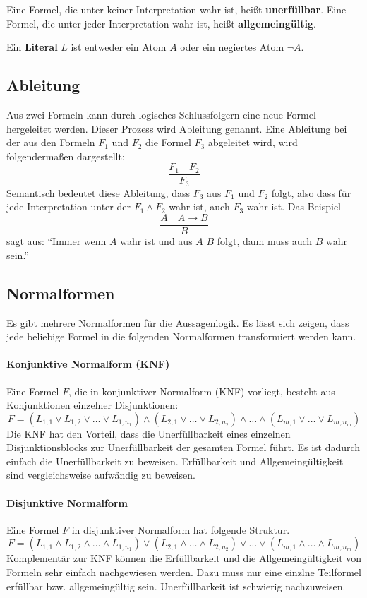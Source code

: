 Eine Formel, die unter keiner Interpretation wahr ist, heißt \textbf{unerfüllbar}. Eine Formel, die unter jeder Interpretation wahr ist, heißt \textbf{allgemeingültig}.

Ein \textbf{Literal} $L$ ist entweder ein Atom $A$ oder ein negiertes Atom $\neg A$. 
		\subsection{Ableitung}
Aus zwei Formeln kann durch logisches Schlussfolgern eine neue Formel hergeleitet werden. Dieser Prozess wird Ableitung genannt. Eine Ableitung bei der aus den Formeln $F_1$ und $F_2$ die Formel $F_3$ abgeleitet wird, wird folgendermaßen dargestellt:
$$\frac{F_1 \quad F_2}{F_3}$$
Semantisch bedeutet diese Ableitung, dass $F_3$ aus $F_1$ und $F_2$ folgt, also dass für jede Interpretation unter der $F_1 \wedge F_2$ wahr ist, auch $F_3$ wahr ist.
Das Beispiel 
$$\frac{A\quad A\to B}{B}$$
sagt aus: "`Immer wenn $A$ wahr ist und aus $A$ $B$ folgt, dann muss auch $B$ wahr sein."'

\subsection{Normalformen}\label{section:Normalformen}
Es gibt mehrere Normalformen für die Aussagenlogik. Es lässt sich zeigen, dass jede beliebige Formel in die folgenden Normalformen transformiert werden kann.
\paragraph{Konjunktive Normalform (KNF)}
Eine Formel $F$, die in konjunktiver Normalform (KNF) vorliegt, besteht aus Konjunktionen einzelner Disjunktionen:
$$F=(L_{1,1} \vee L_{1,2} \vee \ldots \vee L_{1,n_1}) \wedge
   (L_{2,1} \vee \ldots \vee L_{2,n_2}) \wedge \ldots \wedge
   (L_{m,1} \vee \ldots \vee L_{m,n_m})$$
Die KNF hat den Vorteil, dass die Unerfüllbarkeit eines einzelnen Disjunktionsblocks zur Unerfüllbarkeit der gesamten Formel führt. Es ist dadurch einfach die Unerfüllbarkeit zu beweisen. Erfüllbarkeit und Allgemeingültigkeit sind vergleichsweise aufwändig zu beweisen.
\paragraph{Disjunktive Normalform}
Eine Formel $F$ in disjunktiver Normalform hat folgende Struktur.
$$F=(L_{1,1} \wedge L_{1,2} \wedge \ldots \wedge L_{1,n_1}) \vee
(L_{2,1} \wedge \ldots \wedge L_{2,n_2}) \vee \ldots \vee
(L_{m,1} \wedge \ldots \wedge L_{m,n_m})$$
Komplementär zur KNF können die Erfüllbarkeit und die Allgemeingültigkeit von Formeln sehr einfach nachgewiesen werden. Dazu muss nur eine einzlne Teilformel erfüllbar bzw. allgemeingültig sein. Unerfüllbarkeit ist schwierig nachzuweisen.

